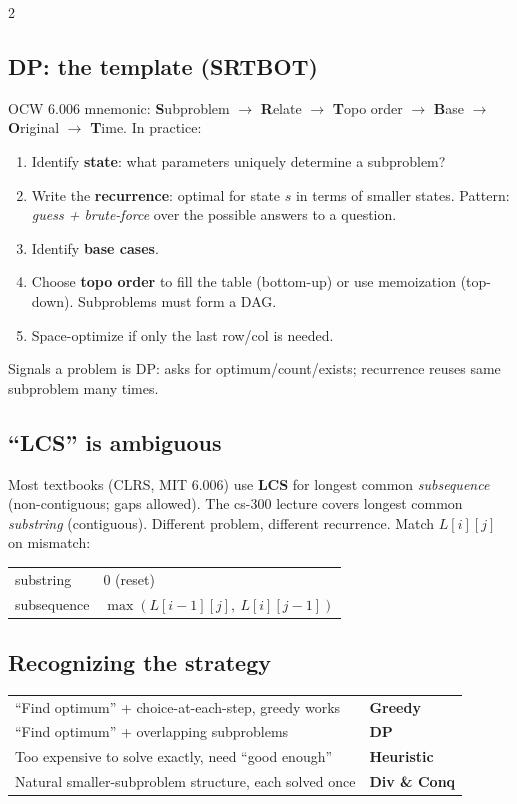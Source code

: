 \documentclass[10pt]{article}
\begin{document}
\begin{multicols}{2}
\subsection*{DP: the template (SRTBOT)}
OCW 6.006 mnemonic: \textbf{S}ubproblem $\to$ \textbf{R}elate $\to$
\textbf{T}opo order $\to$ \textbf{B}ase $\to$ \textbf{O}riginal $\to$
\textbf{T}ime. In practice:
\begin{enumerate}
    \item Identify \textbf{state}: what parameters uniquely determine a
    subproblem?
    \item Write the \textbf{recurrence}: optimal for state $s$ in terms
    of smaller states. Pattern: \emph{guess + brute-force} over the
    possible answers to a question.
    \item Identify \textbf{base cases}.
    \item Choose \textbf{topo order} to fill the table (bottom-up) or
    use memoization (top-down). Subproblems must form a DAG.
    \item Space-optimize if only the last row/col is needed.
\end{enumerate}
Signals a problem is DP: asks for optimum/count/exists; recurrence
reuses same subproblem many times.

\subsection*{``LCS'' is ambiguous}
Most textbooks (CLRS, MIT 6.006) use \textbf{LCS} for longest common
\emph{subsequence} (non-contiguous; gaps allowed). The cs-300 lecture
covers longest common \emph{substring} (contiguous). Different problem,
different recurrence. Match $L[i][j]$ on mismatch:
\begin{tabular}{@{}ll@{}}
substring   & $0$ (reset)\\
subsequence & $\max(L[i{-}1][j],\ L[i][j{-}1])$\\
\end{tabular}

\subsection*{Recognizing the strategy}
\begin{tabular}{@{}lp{4cm}@{}}
``Find optimum'' + choice-at-each-step, greedy works &
\textbf{Greedy}\\
``Find optimum'' + overlapping subproblems   & \textbf{DP}\\
Too expensive to solve exactly, need ``good enough'' & \textbf{Heuristic}\\
Natural smaller-subproblem structure, each solved once & \textbf{Div \& Conq}
\end{tabular}


\end{multicols}
\end{document}
